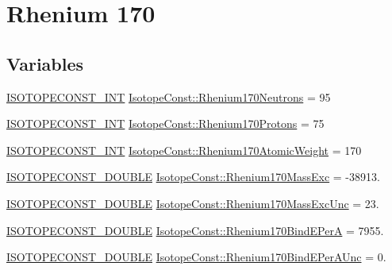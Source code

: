 \hypertarget{group___isotope_const-_rhenium-_re170}{}\section{Rhenium 170}
\label{group___isotope_const-_rhenium-_re170}
\subsection*{Variables}
\begin{DoxyCompactItemize}
\item 
\mbox{\hyperlink{group___isotope_const-_macros_ga5f18360b3e99483a35c32d789e62621c}{I\+S\+O\+T\+O\+P\+E\+C\+O\+N\+S\+T\+\_\+\+I\+NT}} \mbox{\hyperlink{group___isotope_const-_rhenium-_re170_ga1d9043b83089380acdc324a3cd136bfd}{Isotope\+Const\+::\+Rhenium170\+Neutrons}} = 95
\item 
\mbox{\hyperlink{group___isotope_const-_macros_ga5f18360b3e99483a35c32d789e62621c}{I\+S\+O\+T\+O\+P\+E\+C\+O\+N\+S\+T\+\_\+\+I\+NT}} \mbox{\hyperlink{group___isotope_const-_rhenium-_re170_ga7737328f2749ddc8b212ba6fa25aa5ce}{Isotope\+Const\+::\+Rhenium170\+Protons}} = 75
\item 
\mbox{\hyperlink{group___isotope_const-_macros_ga5f18360b3e99483a35c32d789e62621c}{I\+S\+O\+T\+O\+P\+E\+C\+O\+N\+S\+T\+\_\+\+I\+NT}} \mbox{\hyperlink{group___isotope_const-_rhenium-_re170_gaaca7844333e9202f86f9ec8b03885319}{Isotope\+Const\+::\+Rhenium170\+Atomic\+Weight}} = 170
\item 
\mbox{\hyperlink{group___isotope_const-_macros_ga8f45a7272ce02c0b4c65c44636ed719a}{I\+S\+O\+T\+O\+P\+E\+C\+O\+N\+S\+T\+\_\+\+D\+O\+U\+B\+LE}} \mbox{\hyperlink{group___isotope_const-_rhenium-_re170_ga86e761c769ffe7b3929b50682c3e04f7}{Isotope\+Const\+::\+Rhenium170\+Mass\+Exc}} = -\/38913.
\item 
\mbox{\hyperlink{group___isotope_const-_macros_ga8f45a7272ce02c0b4c65c44636ed719a}{I\+S\+O\+T\+O\+P\+E\+C\+O\+N\+S\+T\+\_\+\+D\+O\+U\+B\+LE}} \mbox{\hyperlink{group___isotope_const-_rhenium-_re170_ga0f972883277c1e2854322f293a838420}{Isotope\+Const\+::\+Rhenium170\+Mass\+Exc\+Unc}} = 23.
\item 
\mbox{\hyperlink{group___isotope_const-_macros_ga8f45a7272ce02c0b4c65c44636ed719a}{I\+S\+O\+T\+O\+P\+E\+C\+O\+N\+S\+T\+\_\+\+D\+O\+U\+B\+LE}} \mbox{\hyperlink{group___isotope_const-_rhenium-_re170_ga56f613493a57e0fc4c888fdf6cb84704}{Isotope\+Const\+::\+Rhenium170\+Bind\+E\+PerA}} = 7955.
\item 
\mbox{\hyperlink{group___isotope_const-_macros_ga8f45a7272ce02c0b4c65c44636ed719a}{I\+S\+O\+T\+O\+P\+E\+C\+O\+N\+S\+T\+\_\+\+D\+O\+U\+B\+LE}} \mbox{\hyperlink{group___isotope_const-_rhenium-_re170_gabc6bd18f7cc4cbabf76b3e391d912eca}{Isotope\+Const\+::\+Rhenium170\+Bind\+E\+Per\+A\+Unc}} = 0.

\end{DoxyCompactItemize}
